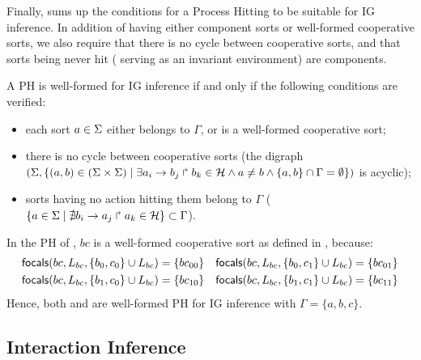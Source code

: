 Finally,  sums up the conditions for a Process Hitting to be suitable for IG
inference.
In addition of having either component sorts or well-formed cooperative sorts, we also require that
there is no cycle between cooperative sorts, and that
sorts being never hit (\ie{} serving as an invariant environment) are components.

\begin{property}\label{pro:wf-ph}
A PH is well-formed for IG inference if and only if the following conditions are verified:
\begin{itemize}
\item 
each sort $a\in\Sigma$ either belongs to $\Gamma$, or is a well-formed cooperative sort;
\item 
there is no cycle between cooperative sorts
(the digraph $(\Sigma,\{(a,b)\in(\Sigma\times\Sigma)\mid \exists a_i\rightarrow b_j\Rsh b_k\in\mathcal{H}
\wedge a\neq b\wedge \{a,b\}\cap\Gamma=\emptyset \})$ is
acyclic);
\item 
sorts having no action hitting them belong to $\Gamma$
($\{ a \in \Sigma\mid \nexists b_i\rightarrow a_j\Rsh a_k\in\mathcal{H}\} \subset \Gamma$).
\end{itemize}
\end{property}

\begin{example*}
In the PH of , $bc$ is a well-formed cooperative sort as defined in , because:
\begin{align*}
\mathsf{focals}(bc, L_{bc}, \{b_0, c_0\} \cup L_{bc}) = \{bc_{00}\} && \mathsf{focals}(bc, L_{bc}, \{b_0, c_1\} \cup L_{bc}) = \{bc_{01}\} \\
\mathsf{focals}(bc, L_{bc}, \{b_1, c_0\} \cup L_{bc}) = \{bc_{10}\} && \mathsf{focals}(bc, L_{bc}, \{b_1, c_1\} \cup L_{bc}) = \{bc_{11}\}
\end{align*}
Hence, both  and  are well-formed PH for IG inference
with $\Gamma = \{a,b,c\}$.
\end{example*}


\subsection{Interaction Inference}\label{ssec:infer-IG}


